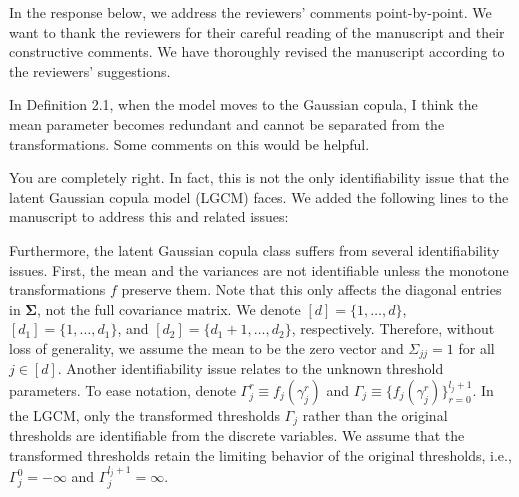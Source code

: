 In the response below, we address the reviewers' comments point-by-point. We want to thank the reviewers for their careful reading of the manuscript and their constructive comments. We have thoroughly revised the manuscript according to the reviewers' suggestions.

\reviewersection


\begin{point}
    In Definition 2.1, when the model moves to the Gaussian copula, I think the mean parameter becomes redundant and cannot be separated from the transformations. Some comments on this would be helpful.
\end{point}

\begin{reply}
    You are completely right. In fact, this is not the only identifiability issue that the latent Gaussian copula model (LGCM) faces. We added the following lines to the manuscript to address this and related issues:
\end{reply}


\begin{change}
    Furthermore, the latent Gaussian copula class suffers from several identifiability issues. First, the mean and the variances are not identifiable unless the monotone transformations \(f\) preserve them. Note that this only affects the diagonal entries in \(\mathbf\Sigma\), not the full covariance matrix. We denote \([d] = \{1,\dots,d\}\), \([d_1] = \{1,\dots,d_1\}\), and \([d_2] = \{d_1 +1, \dots, d_2\}\), respectively. Therefore, without loss of generality, we assume the mean to be the zero vector and \(\Sigma_{jj} = 1\) for all \(j \in [d]\). Another identifiability issue relates to the unknown threshold parameters. To ease notation, denote \(\Gamma_j^r \equiv f_j(\gamma_j^r)\) and \(\Gamma_j \equiv \{f_j(\gamma_j^r)\}_{r=0}^{l_j+1}\). In the LGCM, only the transformed thresholds \(\Gamma_j\) rather than the original thresholds are identifiable from the discrete variables. We assume that the transformed thresholds retain the limiting behavior of the original thresholds, i.e., \(\Gamma_{j}^{0} = -\infty\) and \(\Gamma_j^{l_j+1} = \infty\).
\end{change}


